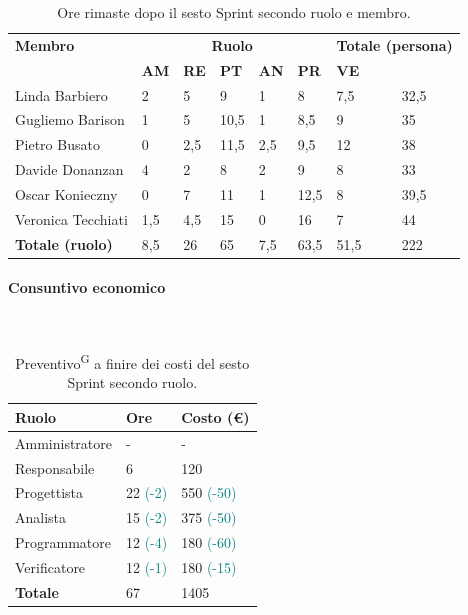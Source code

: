 \documentclass[8pt]{article}
\newcommand{\glossterm}[1]{#1\textsuperscript{G}} %
\newcommand{\subsubsubsection}[1]{\paragraph{#1}\mbox{}\\}
\begin{document}
\begin{table}[ht!]
	\centering
	\begin{tabular}{p{3cm} p{1.4cm} p{1.6cm} p{1.5cm} p{1.5cm} p{1.5cm} p{1.5cm} p{2cm}}
		\toprule
        \textbf{Membro} & \multicolumn{5}{c}{\textbf{Ruolo}} & \multicolumn{2}{r}{\textbf{Totale (persona)}}\\
		& \textbf{AM} & \textbf{RE} & \textbf{PT} & \textbf{AN} & \textbf{PR} & \textbf{VE}\\
		\midrule
        Linda Barbiero     & 2    & 5   & 9    & 1   & 8    & 7,5 & 32,5 \\
        Gugliemo Barison   & 1    & 5   & 10,5 & 1   & 8,5  & 9   & 35 \\
        Pietro Busato      & 0   & 2,5 & 11,5 & 2,5 & 9,5  & 12  & 38 \\
        Davide Donanzan    & 4    & 2   & 8    & 2   & 9    & 8   & 33 \\
        Oscar Konieczny    & 0 & 7   & 11   & 1   & 12,5 & 8   & 39,5 \\
        Veronica Tecchiati & 1,5  & 4,5 & 15   & 0   & 16   & 7   & 44 \\
        \midrule
        \textbf{Totale (ruolo)} & 8,5 & 26 & 65 & 7,5 & 63,5 & 51,5 & 222 \\
		\bottomrule
	\end{tabular}
	\caption{Ore rimaste dopo il sesto Sprint secondo ruolo e membro.}
	\label{table:Ore rimaste dopo il sesto Sprint secondo ruolo e membro.}
\end{table}
\subsubsubsection{Consuntivo economico}
\begin{table}[ht!]
    \centering
    \begin{tabular}{p{4cm} p{1.8cm} p{2.2cm}}
        \toprule
        \textbf{Ruolo} & \textbf{Ore} & \textbf{Costo (€)} \\
        \midrule
        Amministratore & -                         & -   \\
        Responsabile   & 6                         & 120 \\
        Progettista    & 22 \textcolor{teal}{(-2)} & 550 \textcolor{teal}{(-50)} \\
        Analista       & 15 \textcolor{teal}{(-2)} & 375 \textcolor{teal}{(-50)} \\
        Programmatore  & 12 \textcolor{teal}{(-4)} & 180 \textcolor{teal}{(-60)} \\
        Verificatore   & 12 \textcolor{teal}{(-1)} & 180 \textcolor{teal}{(-15)} \\
        \bottomrule
        \textbf{Totale} & 67 & 1405
    \end{tabular}
    \caption{\glossterm{Preventivo} a finire dei costi del sesto Sprint secondo ruolo.}
    \label{table:Preventivo a finire dei costi del sesto Sprint secondo ruolo}
\end{table}
\end{document}

